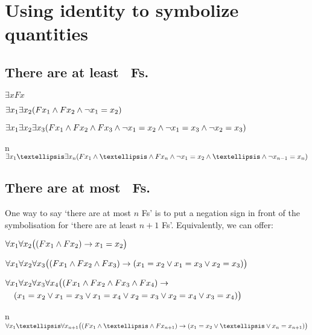 \section*{Using identity to symbolize quantities}

\subsection*{There are at least \blank\ Fs.}
\label{summary.atleast}

\begin{ekey}
\item[\text{one}] $\exists xFx$
\item[\text{two}] $\exists x_1\exists x_2(Fx_1 \wedge Fx_2 \wedge \neg x_1  = x_2)$
\item[\text{three}] $\exists x_1\exists x_2\exists x_3(Fx_1 \wedge Fx_2 \wedge Fx_3 \wedge \neg x_1 = x_2 \wedge\neg x_1 = x_3 \wedge \neg x_2 = x_3)$
\item[n] $\exists x_1…\exists x_n(Fx_1 \eand …\eand Fx_n \eand \enot x_1 = x_2 \eand …\eand \enot x_{n-1} = x_n)$ 
\end{ekey}

\subsection*{There are at most \blank\ Fs.}
\label{summary.atmost}

One way to say `there are at most $n$ Fs' is to put a negation sign in front of the symbolisation for `there are at least $n+1$ Fs'. Equivalently, we can offer:
\begin{ekey}
\item[\text{one}] $\forall x_1\forall x_2\bigl( (Fx_1 \wedge Fx_2) \rightarrow x_1=x_2\bigr)$
\item[\text{two}] $\forall x_1\forall x_2\forall x_3\bigl( (Fx_1 \wedge Fx_2 \wedge Fx_3) \rightarrow (x_1=x_2 \vee x_1=x_3 \vee x_2=x_3) \bigr)$
\item[\text{three}] $\begin{multlined}[t]
	\forall x_1\forall x_2\forall x_3\forall x_4\bigl( (Fx_1 \eand Fx_2 \eand Fx_3 \eand Fx_4) \eif \\
(x_1=x_2 \eor x_1=x_3 \eor x_1=x_4 \eor x_2=x_3 \eor x_2=x_4 \eor x_3=x_4) \bigr)
\end{multlined}$
\item[n]$\forall x_1…\forall x_{n+1}
\bigl( (Fx_1\eand … \eand Fx_{n+1}) \eif (x_1=x_2 \eor … \eor x_n=x_{n+1}) \bigr)$ 
\end{ekey}
